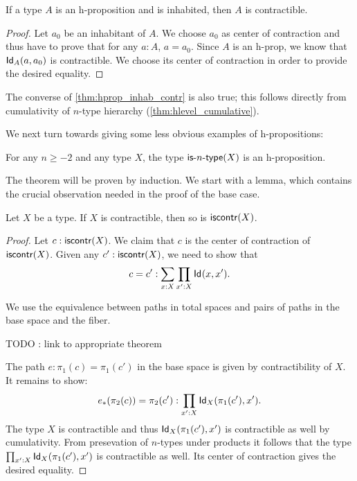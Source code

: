 \begin{thm}\label{thm:hprop_inhab_contr}
 If a type $A$ is an h-proposition and is inhabited, then $A$ is contractible.
\end{thm}

\begin{proof}
 Let $a_0$ be an inhabitant of $A$. We choose $a_0$ as center of contraction and thus have to
  prove that for any $a : A$, $a = a_0$.
  Since $A$ is an h-prop, we know that $\idtype[A]{a}{a_0}$ is contractible.
  We choose its center of contraction in order to provide the desired equality.
\end{proof}

\begin{rmk}\label{rem:is_contr_implies_isaprop_and_element}
 The converse of \autoref{thm:hprop_inhab_contr} is also true; this follows directly from cumulativity of $n$-type hierarchy (\autoref{thm:hlevel_cumulative}).
\end{rmk}

We next turn towards giving some less obvious examples of h-propositions:

\begin{thm}\label{thm:isaprop_isofhlevel}
 For any $n \geq -2$ and any type $X$, the type $\istype{n}(X)$ is an h-proposition.
\end{thm}

The theorem will be proven by induction. We start with a lemma, which contains the crucial observation needed in the proof of the base case.

\begin{lem}\label{lem:contr_contr_is_contr}
  Let $X$ be a type. If $X$ is contractible, then so is $\iscontr(X)$.
\end{lem}

\begin{proof}
 Let $c : \iscontr(X)$. We claim that $c$ is the center of contraction of $\iscontr (X)$.
  Given any $c' : \iscontr (X)$, we need to show that
       \[ c = c' : \sum_{x:X}\prod_{x':X}\idtype{x}{x'}  . \]

 We use the equivalence between paths in total spaces and pairs of paths in the base space and the fiber.

 TODO : link to appropriate theorem

 The path $e : \pi_1(c) = \pi_1 (c')$ in the base space is given by contractibility of $X$.
 It remains to show:
 \[ \trans{e}{\pi_2(c)} = \pi_2 (c') : \prod_{x' : X} \idtype[X]{\pi_1 (c')} {x'}  .  \]
 The type $X$ is contractible and thus $\idtype[X]{\pi_1 (c')} {x'}$ is contractible as well by cumulativity.
From presevation of $n$-types under products it follows that the type $\prod_{x' : X} \idtype[X]{\pi_1 (c')} {x'}$
  is contractible as well. Its center of contraction gives the desired equality.
\end{proof}


